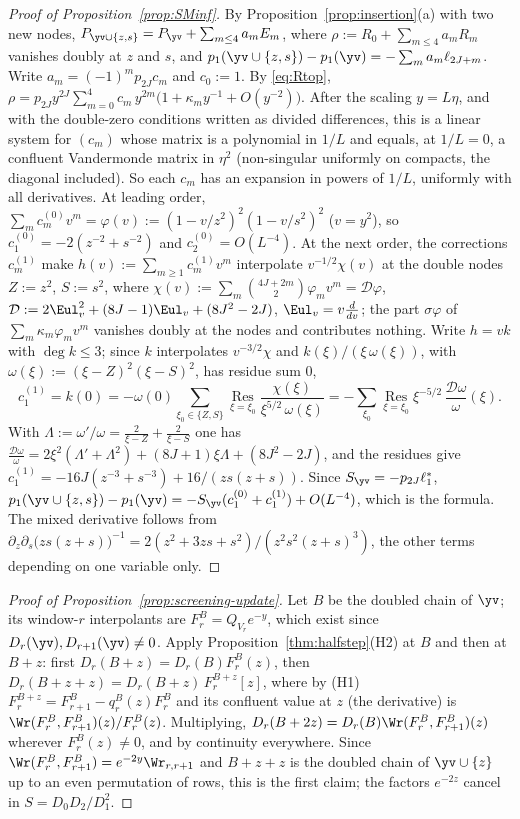 \begin{proof}[Proof of Proposition~\textup{\ref{prop:SMinf}}]
By Proposition~\ref{prop:insertion}(a) with two new nodes, $P_{\yv\cup\{z,s\}}=P_{\yv}+\sum_{m\le4}a_mE_m$, where
$\rho:=R_0+\sum_{m\le4}a_mR_m$ vanishes doubly at $z$ and $s$, and $p_1(\yv\cup\{z,s\})-p_1(\yv)=-\sum_ma_m\ell_{2J+m}$.
Write $a_m=(-1)^mp_{2J}c_m$ and $c_0:=1$. By \eqref{eq:Rtop},
$\rho=p_{2J}y^{2J}\sum_{m=0}^4c_m\,y^{2m}\bigl(1+\kappa_my^{-1}+O(y^{-2})\bigr)$. After the scaling $y=L\eta$, and with the
double-zero conditions written as divided differences, this is a linear system for $(c_m)$ whose matrix is a polynomial
in $1/L$ and equals, at $1/L=0$, a confluent Vandermonde matrix in $\eta^2$ (non-singular uniformly on compacts, the
diagonal included). So each $c_m$ has an expansion in powers of $1/L$, uniformly with all derivatives. At leading
order, $\sum_mc_m^{(0)}v^m=\varphi(v):=(1-v/z^2)^2(1-v/s^2)^2$ ($v=y^2$), so
$c_1^{(0)}=-2(z^{-2}+s^{-2})$ and $c_2^{(0)}=O(L^{-4})$. At the next order, the corrections $c^{(1)}_m$ make
$h(v):=\sum_{m\ge1}c_m^{(1)}v^m$ interpolate $v^{-1/2}\chi(v)$ at the double nodes $Z:=z^2$, $S:=s^2$, where
$\chi(v):=\sum_m\binom{4J+2m}2\varphi_mv^m=\mathcal D\varphi$, $\mathcal D:=2\Eul_v^2+(8J-1)\Eul_v+(8J^2-2J)$,
$\Eul_v=v\frac d{dv}$; the part $\sigma\varphi$ of $\sum_m\kappa_m\varphi_mv^m$ vanishes doubly at the nodes and contributes
nothing. Write $h=vk$ with $\deg k\le3$; since $k$ interpolates $v^{-3/2}\chi$ and $k(\xi)/(\xi\,\omega(\xi))$, with
$\omega(\xi):=(\xi-Z)^2(\xi-S)^2$, has residue sum $0$,
\[
  c^{(1)}_1=k(0)=-\omega(0)\sum_{\xi_0\in\{Z,S\}}\operatorname*{Res}_{\xi=\xi_0}\frac{\chi(\xi)}{\xi^{5/2}\,\omega(\xi)}
  =-\sum_{\xi_0}\operatorname*{Res}_{\xi=\xi_0}\xi^{-5/2}\,\frac{\mathcal D\omega}{\omega}(\xi).
\]
With $\Lambda:=\omega'/\omega=\frac2{\xi-Z}+\frac2{\xi-S}$ one has
$\frac{\mathcal D\omega}{\omega}=2\xi^2(\Lambda'+\Lambda^2)+(8J+1)\xi\Lambda+(8J^2-2J)$, and the residues give
$c^{(1)}_1=-16J(z^{-3}+s^{-3})+16/(zs(z+s))$. Since $S_{\yv}=-p_{2J}\ell_1^*$,
$p_1(\yv\cup\{z,s\})-p_1(\yv)=-S_{\yv}(c_1^{(0)}+c_1^{(1)})+O(L^{-4})$, which is the formula. The mixed derivative follows
from $\partial_z\partial_s\bigl(zs(z+s)\bigr)^{-1}=2(z^2+3zs+s^2)/(z^2s^2(z+s)^3)$, the other terms depending on one
variable only.
\end{proof}

\begin{proof}[Proof of Proposition~\textup{\ref{prop:screening-update}}]
Let $B$ be the doubled chain of $\yv$; its window-$r$ interpolants are $F_r^B=Q_{V_r}e^{-y}$, which exist since
$D_r(\yv),D_{r+1}(\yv)\neq0$. Apply Proposition~\ref{thm:halfstep}(H2) at $B$ and then at $B+z$: first
$D_r(B+z)=D_r(B)F_r^B(z)$, then $D_r(B+z+z)=D_r(B+z)\,F_r^{B+z}[z]$, where by (H1)
$F_r^{B+z}=F_{r+1}^B-q_r^B(z)F_r^B$ and its confluent value at $z$ (the derivative) is
$\Wr(F_r^B,F_{r+1}^B)(z)/F_r^B(z)$. Multiplying, $D_r(B+2z)=D_r(B)\Wr(F_r^B,F_{r+1}^B)(z)$ wherever $F_r^B(z)\neq0$, and by
continuity everywhere. Since $\Wr(F_r^B,F_{r+1}^B)=e^{-2y}\Wr_{r,r+1}$ and $B+z+z$ is the doubled chain of
$\yv\cup\{z\}$ up to an even permutation of rows, this is the first claim; the factors $e^{-2z}$ cancel in
$S=D_0D_2/D_1^2$.
\end{proof}

